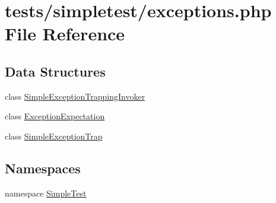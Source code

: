 \hypertarget{exceptions_8php}{\section{tests/simpletest/exceptions.php File Reference}
\label{exceptions_8php}
}
\subsection*{Data Structures}
\begin{DoxyCompactItemize}
\item 
class \hyperlink{class_simple_exception_trapping_invoker}{Simple\-Exception\-Trapping\-Invoker}
\item 
class \hyperlink{class_exception_expectation}{Exception\-Expectation}
\item 
class \hyperlink{class_simple_exception_trap}{Simple\-Exception\-Trap}
\end{DoxyCompactItemize}
\subsection*{Namespaces}
\begin{DoxyCompactItemize}
\item 
namespace \hyperlink{namespace_simple_test}{Simple\-Test}
\end{DoxyCompactItemize}
